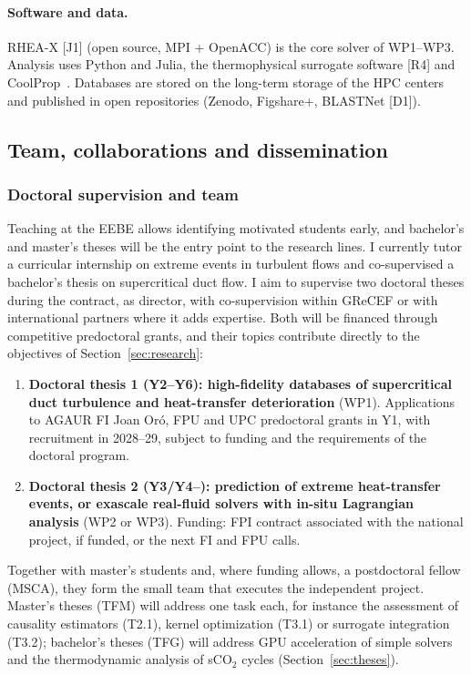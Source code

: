 \documentclass[11pt]{article}
\begin{document}
\paragraph{Software and data.} RHEA-X [J1] (open source, MPI + OpenACC) is the core solver of
WP1--WP3. Analysis uses Python and Julia, the thermophysical surrogate software [R4] and
CoolProp~\cite{CoolProp2014}. Databases are stored on the long-term storage of the HPC centers
and published in open repositories (Zenodo, Figshare+, BLASTNet [D1]).


\subsection{Team, collaborations and dissemination}\label{sec:mobility}\label{sec:dissemination}
\subsubsection*{Doctoral supervision and team}
Teaching at the EEBE allows identifying motivated students early, and bachelor's and
master's theses will be the entry point to the research lines. I currently tutor a
curricular internship on extreme events in turbulent flows and co-supervised a bachelor's
thesis on supercritical duct flow. I aim to supervise two doctoral theses during the
contract, as director, with co-supervision within GReCEF or with international partners where
it adds expertise. Both will be financed through competitive predoctoral grants, and their
topics contribute directly to the objectives of Section~\ref{sec:research}:
\begin{enumerate}
  \item \textbf{Doctoral thesis 1 (Y2--Y6): high-fidelity databases of supercritical duct
  turbulence and heat-transfer deterioration} (WP1). Applications to AGAUR FI Joan Or\'o, FPU
  and UPC predoctoral grants in Y1, with recruitment in 2028--29, subject to funding and the
  requirements of the doctoral program.
  \item \textbf{Doctoral thesis 2 (Y3/Y4--): prediction of extreme heat-transfer events, or
  exascale real-fluid solvers with in-situ Lagrangian analysis} (WP2 or WP3). Funding: FPI
  contract associated with the national project, if funded, or the next FI and FPU calls.
\end{enumerate}
Together with master's students and, where funding allows, a postdoctoral fellow (MSCA), they
form the small team that executes the independent project.
Master's theses (TFM) will address one task each, for instance the assessment of causality
estimators (T2.1), kernel optimization (T3.1) or surrogate integration (T3.2); bachelor's
theses (TFG) will address GPU acceleration of simple solvers and the thermodynamic analysis of
sCO$_2$ cycles (Section~\ref{sec:theses}).
\end{document}
